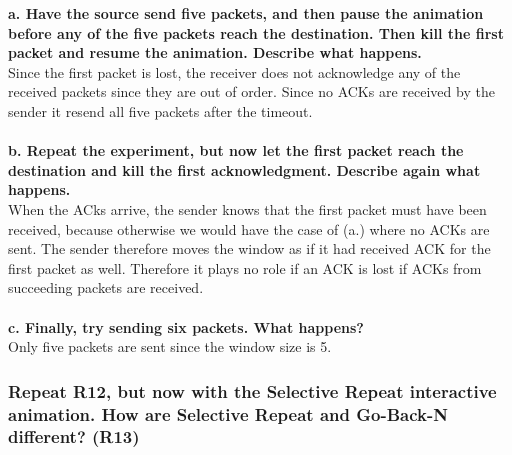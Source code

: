 \textbf{a. Have the source send five packets, and then pause the animation before any of the five packets reach the destination. Then kill the first packet and resume the animation. Describe what happens.} \\
Since the first packet is lost, the receiver does not acknowledge any of the received packets since they are out of order. Since no ACKs are received by the sender it resend all five packets after the timeout. \\
\\
\textbf{b. Repeat the experiment, but now let the first packet reach the destination and kill the first acknowledgment. Describe again what happens.} \\
When the ACks arrive, the sender knows that the first packet must have been received, because otherwise we would have the case of (a.) where no ACKs are sent. The sender therefore moves the window as if it had received ACK for the first packet as well. Therefore it plays no role if an ACK is lost if ACKs from succeeding packets are received. \\
\\
\textbf{c. Finally, try sending six packets. What happens?} \\
Only five packets are sent since the window size is 5.


\subsubsection{Repeat R12, but now with the Selective Repeat interactive animation. How are Selective Repeat and Go-Back-N different? (R13)}


